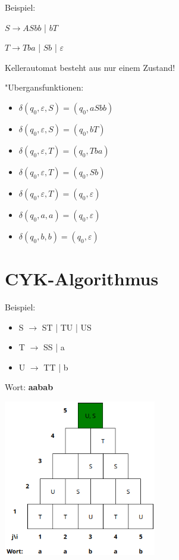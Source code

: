 \documentclass[11pt, a4paper]{scrartcl}
\begin{document}
Beispiel:

\vspace{0.5em}

$S \rightarrow ASbb$ | $bT$

$T \rightarrow Tba$ | $Sb$ | $\varepsilon$

\vspace{0.5em}

Kellerautomat besteht aus nur einem Zustand!

\vspace{0.5em}

"Ubergansfunktionen:
\begin{itemize}
    \item $\delta(q_0, \varepsilon, S) = (q_0, aSbb)$
    \item $\delta(q_0, \varepsilon, S) = (q_0, bT)$
    \item $\delta(q_0, \varepsilon, T) = (q_0, Tba)$
    \item $\delta(q_0, \varepsilon, T) = (q_0, Sb)$
    \item $\delta(q_0, \varepsilon, T) = (q_0, \varepsilon)$
    \item $\delta(q_0, a, a) = (q_0, \varepsilon)$
    \item $\delta(q_0, b, b) = (q_0, \varepsilon)$
\end{itemize}



\newpage


\section{CYK-Algorithmus}

Beispiel:

\begin{itemize}
    \item S $\rightarrow$ ST | TU | US
    \item T $\rightarrow$ SS | a
    \item U $\rightarrow$ TT | b
\end{itemize}

Wort: \textbf{aabab}

\vspace{2em}

\includegraphics[width=0.5\textwidth]{CYK-00.png}
\end{document}
